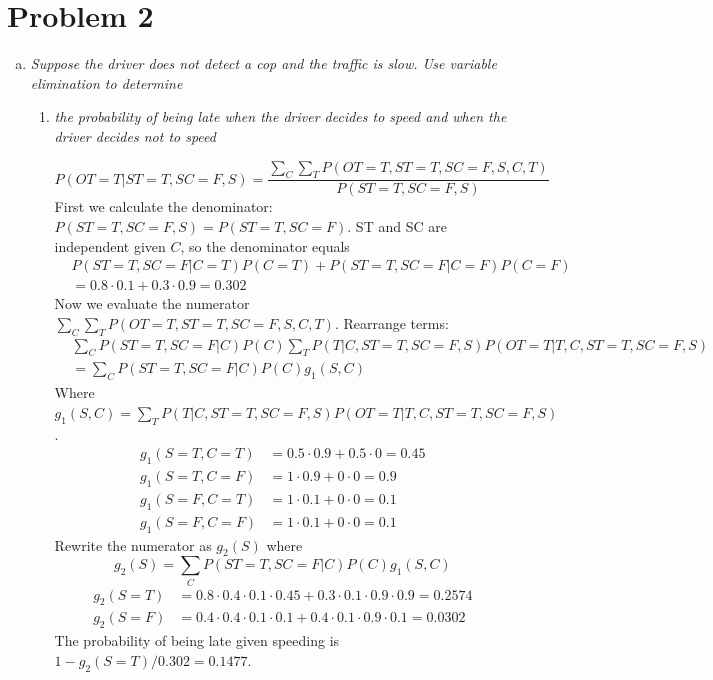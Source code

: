 \documentclass{article}
\begin{document}
\section{Problem 2}
\begin{enumerate}[(a)]
\item \textit{Suppose the driver does not detect a cop and the traffic
  is slow.  Use variable elimination to determine}


  \begin{enumerate}
  \item \textit{the probability of being late when the driver decides
    to speed and when the driver decides not to speed}

    $$P(OT=T|ST=T,SC=F,S)=\frac{\sum_C\sum_T P(OT=T,ST=T,SC=F,S,C,T)}{P(ST=T,SC=F,S)}$$
    First we calculate the denominator: $P(ST=T,SC=F,S)=P(ST=T,SC=F)$. ST and SC are
    independent given $C$, so the denominator equals
    \begin{align*}
    &P(ST=T,SC=F|C=T)P(C=T)+P(ST=T,SC=F|C=F)P(C=F)\\
    &=0.8\cdot 0.1+0.3\cdot 0.9=0.302
    \end{align*}
    Now we evaluate the numerator $\sum_C\sum_T P(OT=T,ST=T,SC=F,S,C,T)$.
    Rearrange terms:
    \begin{align*}
    &\sum_C P(ST=T,SC=F|C)P(C) \sum_T P(T|C,ST=T,SC=F,S)P(OT=T|T,C,ST=T,SC=F,S)\\
    &=\sum_C P(ST=T,SC=F|C)P(C) g_1(S,C)
    \end{align*}
    Where $g_1(S,C)= \sum_T P(T|C,ST=T,SC=F,S)P(OT=T|T,C,ST=T,SC=F,S)$.
    \begin{align*}
    g_1(S=T,C=T)&=0.5\cdot 0.9+0.5\cdot 0=0.45\\
    g_1(S=T,C=F)&=1\cdot 0.9+0\cdot 0=0.9\\
    g_1(S=F,C=T)&=1\cdot 0.1+0\cdot 0=0.1\\
    g_1(S=F,C=F)&=1\cdot 0.1+0\cdot 0=0.1
    \end{align*}
    Rewrite the numerator as $g_2(S)$ where
    $$g_2(S)=\sum_C P(ST=T,SC=F|C)P(C)g_1(S,C)$$
    \begin{align*}
    g_2(S=T)&=0.8\cdot 0.4\cdot 0.1\cdot 0.45+0.3\cdot 0.1\cdot 0.9\cdot 0.9=0.2574\\
    g_2(S=F)&=0.4\cdot 0.4\cdot 0.1\cdot 0.1+0.4\cdot 0.1\cdot 0.9\cdot 0.1=0.0302
    \end{align*}
    The probability of being late given speeding is $1-g_2(S=T)/0.302=0.1477$.


\end{enumerate}
\end{enumerate}
\end{document}
